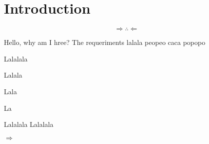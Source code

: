 \chapter{Introduction}

\lipsum[01-20]

\begin{equation}
  \Rightarrow \therefore \Leftarrow
\end{equation}

Hello, why am I hree? The requeriments lalala peopeo caca popopo

Lalalala

Lalala

Lala

La

Lalalala
Lalalala

$\Rightarrow$

